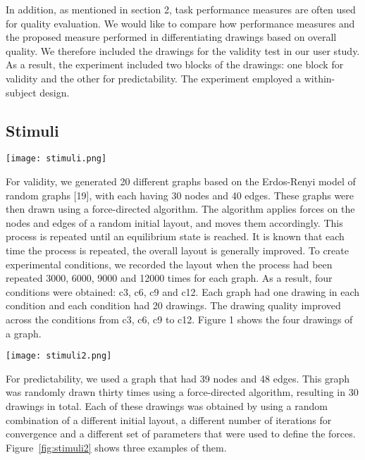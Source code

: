 \documentclass[conference,letterpaper]{IEEEtran}
\begin{document}
In addition, as mentioned in section 2, task performance measures are often used for quality evaluation. We would like to compare how performance measures and the proposed measure performed in differentiating drawings based on overall quality. We therefore included the drawings for the validity test in our user study. As a result, the experiment included two blocks of the drawings: one block for validity and the other for predictability. The experiment employed a within-subject design.
 
\subsection{Stimuli}

\begin{figure*}[t]
\centering
\texttt{[image: stimuli.png]}
\caption{An example of the four drawing conditions of a graph for validity} \label{fig:stimuli1}
\end{figure*}

For validity, we generated 20 different graphs based on the Erdos-Renyi model of random graphs [19], with each having 30 nodes and 40 edges. These graphs were then drawn using a force-directed algorithm. The algorithm applies forces on the nodes and edges of a random initial layout, and moves them accordingly. This process is repeated until an equilibrium state is reached. It is known that each time the process is repeated, the overall layout is generally improved. To create experimental conditions, we recorded the layout when the process had been repeated 3000, 6000, 9000 and 12000 times for each graph. As a result, four conditions were obtained: c3, c6, c9 and c12. Each graph had one drawing in each condition and each condition had 20 drawings. The drawing quality improved across the conditions from c3, c6, c9 to c12. Figure 1 shows the four drawings of a graph.

\begin{figure*}[t]
\centering
\texttt{[image: stimuli2.png]}
\caption{Three examples of the thirty drawings of a graph for predictability} \label{fig:stimuli2}
\end{figure*}


For predictability, we used a graph that had 39 nodes and 48 edges. This graph was randomly drawn thirty times using a force-directed algorithm, resulting in 30 drawings in total. Each of these drawings was obtained by using a random combination of a different initial layout, a different number of iterations for convergence and a different set of parameters that were used to define the forces. Figure~\ref{fig:stimuli2} shows three examples of them.
\end{document}
